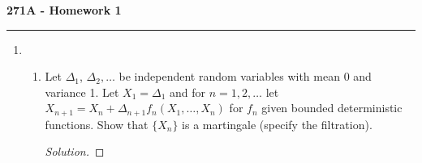 \documentclass[11pt,letterpaper]{report}
\newenvironment{solution}
{\begin{proof}[Solution]}
{\end{proof}}
\begin{document}
\begin{center}
{\bf \Large 271A - Homework 1}
\vspace{0.2cm}
\hrule
\end{center}

\begin{enumerate}
	\item \begin{enumerate}
		\item Let $\Delta_1$, $\Delta_2, \ldots$ be independent random variables with mean 0 and variance 1. Let $X_1 = \Delta_1$ and for $n = 1, 2, \ldots$ let $X_{n+1} = X_n + \Delta_{n+1}f_n(X_1, \ldots, X_n)$ for $f_n$ given bounded deterministic functions. Show that $\{X_n\}$ is a martingale (specify the filtration).
		\begin{solution}
			
		\end{solution}
	\end{enumerate}
\end{enumerate}
\end{document}

